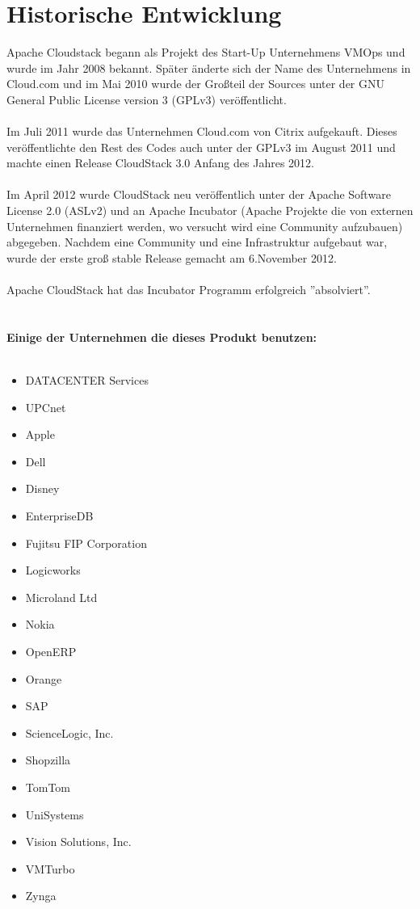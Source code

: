 \documentclass[a4paper,nochapterprefix,english,12pt]{scrreprt}
\begin{document}
\section{Historische Entwicklung \cite{apachehistory,apacheusers}}
Apache Cloudstack begann als Projekt des Start-Up Unternehmens VMOps und wurde im Jahr 2008 bekannt. Später änderte sich der Name des Unternehmens in Cloud.com und im Mai 2010 wurde der Großteil der Sources unter der GNU General Public License version 3 (GPLv3) veröffentlicht.\\\\
Im Juli 2011 wurde das Unternehmen Cloud.com von Citrix aufgekauft. Dieses veröffentlichte den Rest des Codes auch unter der GPLv3 im August 2011 und machte einen Release CloudStack 3.0 Anfang des Jahres 2012.\\\\
Im April 2012 wurde CloudStack neu veröffentlich unter der Apache Software License 2.0 (ASLv2) und an Apache Incubator (Apache Projekte die von externen Unternehmen finanziert werden, wo versucht wird eine Community aufzubauen) abgegeben. Nachdem eine Community und eine Infrastruktur aufgebaut war, wurde der erste groß stable Release gemacht am 6.November 2012.\\\\
Apache CloudStack hat das Incubator Programm erfolgreich ''absolviert''.\\\\\\
\textbf{Einige der Unternehmen die dieses Produkt benutzen:\\\\}
\begin{minipage}{.5\textwidth}
	\begin{itemize}
		\item DATACENTER Services
		\item UPCnet
		\item Apple
		\item Dell
		\item Disney
		\item EnterpriseDB
		\item Fujitsu FIP Corporation
		\item Logicworks
		\item Microland Ltd
		\item Nokia
	\end{itemize}
\end{minipage}
\begin{minipage}{.5\textwidth}
	\begin{itemize}
		\item OpenERP
		\item Orange
		\item SAP
		\item ScienceLogic, Inc.
		\item Shopzilla
		\item TomTom
		\item UniSystems
		\item Vision Solutions, Inc.
		\item VMTurbo
		\item Zynga
	\end{itemize}
\end{minipage}
\end{document}
